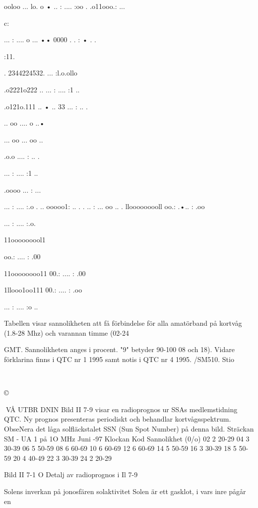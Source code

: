 \documentclass[a4paper,twoside,twocolumn,openright]{book}
\begin{document}
{{{{{{ooloo ... lo. o
• .. : .... :oo .
.o11ooo.: ...

c:

... : .... o ...
•• 0000 . . : • . .

:11.

. 2344224532.
... :l.o.ollo

.o2221o222 ..
... : .... :1 ..

.o121o.111 ..
• .. 33 ... : .. .

.. oo .... o ..•

... oo ... oo ..

.o.o .... : .. .

... : .... :1 ..

.oooo ... : ...

... : .... :.o .
.. ooooo1: .. .
. .. : ... oo .. .
llooooooooll
oo.: .•.. : .oo

... : .... :.o.

11ooooooool1

oo.: .... : .00

11oooooooo11
00.: .... : .00

1llooo1oo111
00.: .... : .oo

... : .... :o ..

Tabellen visar sannolikheten att få förbindelse för alla amatörband på kortvåg (1.8-28 Mhz) och varannan timme (02-24} GMT. Sannolikheten
anges i procent. "9" betyder 90-100 %
08 och 18). Vidare förklarina finns i QTC nr 1 1995 samt notis i QTC nr 4 1995. /SM510. Stio

~

©

VÅ UTBR DNIN
Bild II 7-9 visar en radioprognos ur SSAs
medlemstidning QTC. Ny prognos presenteras periodiskt och behandlar kortvågsspektrum. ObseNera det låga solfläckstalet SSN
(Sun Spot Number) på denna bild.
Sträckan SM - UA 1 på 1O MHz Juni -97
Klockan
Kod
Sannolikhet (0/o)
02
2
20-29
04
3
30-39
06
5
50-59
08
6
60-69
10
6
60-69
12
6
60-69
14
5
50-59
16
3
30-39
18
5
50-59
20
4
40-49
22
3
30-39
24
2
20-29

Bild II 7-1 O Detalj av radioprognos i Il 7-9

Solens inverkan på jonosfären
solaktivitet
Solen är ett gasklot, i vars inre pågår en

}}}}}
\end{document}
